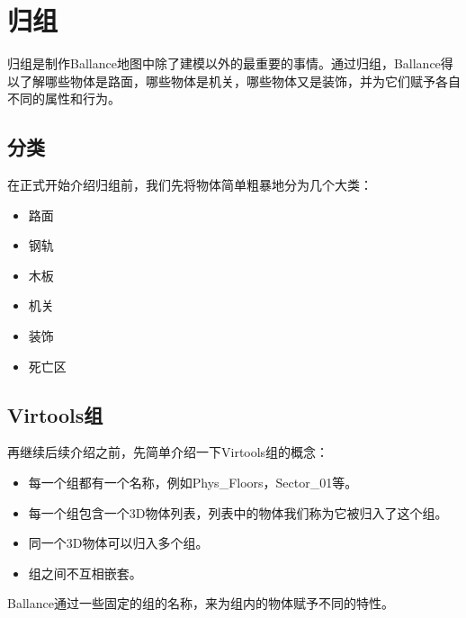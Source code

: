\section{归组}

归组是制作Ballance地图中除了建模以外的最重要的事情。通过归组，Ballance得以了解哪些物体是路面，哪些物体是机关，哪些物体又是装饰，并为它们赋予各自不同的属性和行为。

\subsection{分类}

在正式开始介绍归组前，我们先将物体简单粗暴地分为几个大类：

\begin{itemize}

\item 路面

\item 钢轨

\item 木板

\item 机关

\item 装饰

\item 死亡区

\end{itemize}

\subsection{Virtools组}

再继续后续介绍之前，先简单介绍一下Virtools组的概念：

\begin{itemize}

\item 每一个组都有一个名称，例如Phys\_Floors，Sector\_01等。

\item 每一个组包含一个3D物体列表，列表中的物体我们称为它被归入了这个组。

\item 同一个3D物体可以归入多个组。

\item 组之间不互相嵌套。

\end{itemize}

Ballance通过一些固定的组的名称，来为组内的物体赋予不同的特性。




